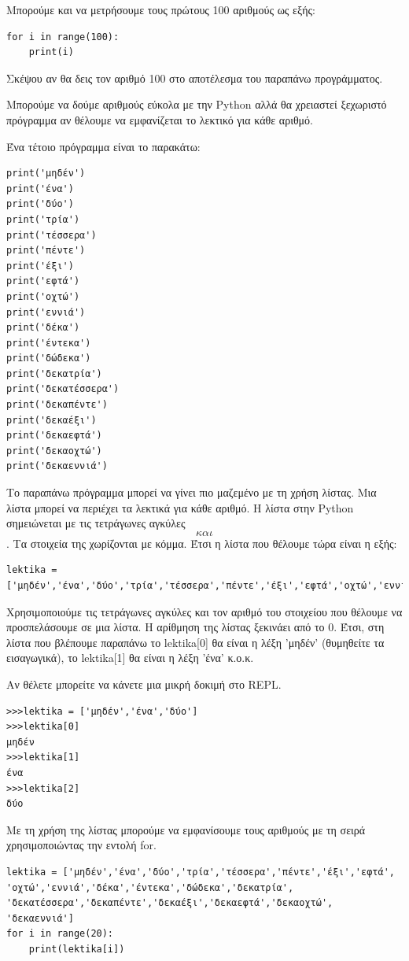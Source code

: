 Mπορούμε και να μετρήσουμε τους πρώτους 100 αριθμούς ως εξής:
\begin{lstlisting}
for i in range(100):
    print(i)
\end{lstlisting}

Σκέψου αν θα δεις τον αριθμό 100 στο αποτέλεσμα του παραπάνω προγράμματος.

Μπορούμε να δούμε αριθμούς εύκολα με την Python αλλά θα χρειαστεί ξεχωριστό πρόγραμμα αν θέλουμε να εμφανίζεται το λεκτικό  για κάθε αριθμό.

Ένα τέτοιο πρόγραμμα είναι το παρακάτω:
\begin{lstlisting}
print('μηδέν')
print('ένα')
print('δύο')
print('τρία')
print('τέσσερα')
print('πέντε')
print('έξι')
print('εφτά')
print('οχτώ')
print('εννιά')
print('δέκα')
print('έντεκα')
print('δώδεκα')
print('δεκατρία')
print('δεκατέσσερα')
print('δεκαπέντε')
print('δεκαέξι')
print('δεκαεφτά')
print('δεκαοχτώ')
print('δεκαεννιά')
\end{lstlisting}

Το παραπάνω πρόγραμμα μπορεί να γίνει πιο μαζεμένο με τη χρήση λίστας. Μια λίστα μπορεί να περιέχει τα λεκτικά για κάθε αριθμό. Η λίστα στην Python σημειώνεται με τις τετράγωνες αγκύλες \[ και \]. Τα στοιχεία της χωρίζονται με κόμμα. Έτσι η λίστα που θέλουμε τώρα είναι η εξής:
\begin{lstlisting}
lektika = ['μηδέν','ένα','δύο','τρία','τέσσερα','πέντε','έξι','εφτά','οχτώ','εννιά','δέκα','έντεκα','δώδεκα','δεκατρία','δεκατέσσερα','δεκαπέντε','δεκαέξι','δεκαεφτά','δεκαοχτώ','δεκαεννιά']
\end{lstlisting}
Χρησιμοποιούμε τις τετράγωνες αγκύλες και τον αριθμό του στοιχείου που θέλουμε να προσπελάσουμε σε μια λίστα. Η αρίθμηση της λίστας ξεκινάει από το 0. Έτσι, στη λίστα που βλέπουμε παραπάνω το lektika[0] θα είναι η λέξη 'μηδέν' (θυμηθείτε τα εισαγωγικά), το lektika[1] θα είναι η λέξη 'ένα' κ.ο.κ.

Αν θέλετε μπορείτε να κάνετε μια μικρή δοκιμή στο REPL.
\begin{lstlisting}
>>>lektika = ['μηδέν','ένα','δύο']
>>>lektika[0]
μηδέν
>>>lektika[1]
ένα
>>>lektika[2]
δύο
\end{lstlisting}
Με τη χρήση της λίστας μπορούμε να εμφανίσουμε τους αριθμούς με τη σειρά χρησιμοποιώντας την εντολή for.
\begin{lstlisting}
lektika = ['μηδέν','ένα','δύο','τρία','τέσσερα','πέντε','έξι','εφτά',
'οχτώ','εννιά','δέκα','έντεκα','δώδεκα','δεκατρία',
'δεκατέσσερα','δεκαπέντε','δεκαέξι','δεκαεφτά','δεκαοχτώ',
'δεκαεννιά']
for i in range(20):
    print(lektika[i])
\end{lstlisting}

